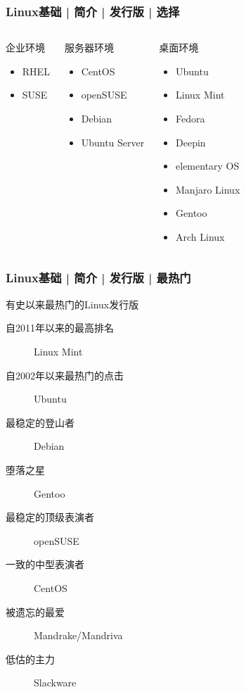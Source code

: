 \begin{frame}
  \frametitle{Linux基础 | 简介 | 发行版 | 选择}
  \begin{columns}
  \begin{block}{企业环境}
    \begin{itemize}
      \item RHEL
      \item SUSE
    \end{itemize}
  \end{block}
  \pause
  \begin{block}{服务器环境}
    \begin{itemize}
      \item CentOS
      \item openSUSE
      \item Debian
      \item Ubuntu Server
    \end{itemize}
  \end{block}
  \pause
  \begin{block}{桌面环境}
    \begin{itemize}
      \item Ubuntu
      \item Linux Mint
      \item Fedora
      \item Deepin
      \item elementary OS
      \item Manjaro Linux
      \item Gentoo
      \item Arch Linux
    \end{itemize}
  \end{block}
\end{columns}
\end{frame}

\begin{frame}
  \frametitle{Linux基础 | 简介 | 发行版 | 最热门}
  \begin{block}{有史以来最热门的Linux发行版}
    \begin{description}
      \item[自2011年以来的最高排名] Linux Mint
      \item[自2002年以来最热门的点击] Ubuntu
      \item[最稳定的登山者] Debian
      \item[堕落之星] Gentoo
      \item[最稳定的顶级表演者] openSUSE
      \item[一致的中型表演者] CentOS
      \item[被遗忘的最爱] Mandrake/Mandriva
      \item[低估的主力] Slackware
    \end{description}
  \end{block}
\end{frame}

